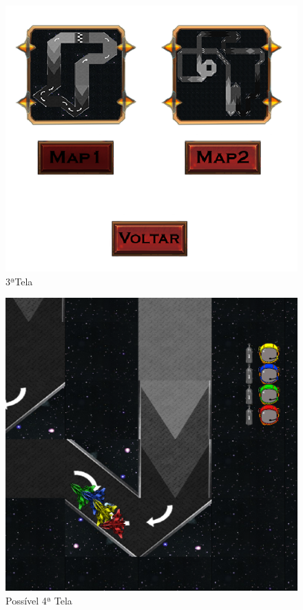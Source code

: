 \documentclass[a4paper]{report} %
\begin{document}
           \begin{figure}[h!]
               \centering
               \includegraphics [scale = 0.4] {sc3.png}
               \caption{3ªTela}
               \end{figure}
           
           \begin{figure}[h!]
               \centering
               \includegraphics [scale = 0.15] {sc7.png}
               \caption{Possível 4ª Tela}
               \end{figure}
           
\end{document}
